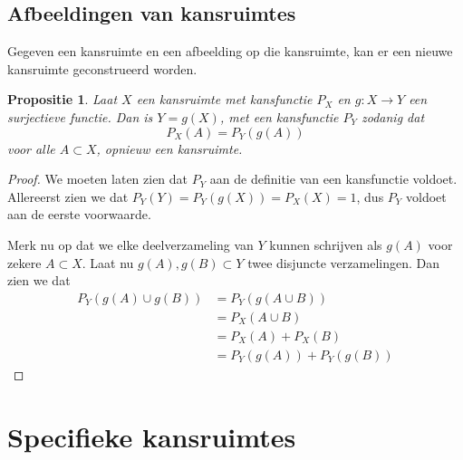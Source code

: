 \documentclass[a4paper]{report}
\newtheorem{proposition}[theorem]{Propositie}
\theoremstyle{definition}
\begin{document}
\section{Afbeeldingen van kansruimtes}
Gegeven een kansruimte en een afbeelding op die kansruimte, kan er een nieuwe kansruimte geconstrueerd worden.

\begin{proposition}
    Laat $X$ een kansruimte met kansfunctie $P_X$ en $g: X \to Y$ een surjectieve functie.
    Dan is $Y = g(X)$, met een kansfunctie $P_Y$ zodanig dat 
    \[ P_X(A) = P_Y(g(A)) \]
    voor alle $A \subset X$, opnieuw een kansruimte.
\end{proposition}
\begin{proof}
    We moeten laten zien dat $P_Y$ aan de definitie van een kansfunctie voldoet.
    Allereerst zien we dat $P_Y(Y) = P_Y(g(X)) = P_X(X) = 1$, dus $P_Y$ voldoet aan de eerste voorwaarde.

    Merk nu op dat we elke deelverzameling van $Y$ kunnen schrijven als $g(A)$ voor zekere $A \subset X$. 
    Laat nu $g(A),g(B) \subset Y$ twee disjuncte verzamelingen.
    Dan zien we dat 
    \begin{align*}
        P_Y(g(A) \cup g(B)) &= P_Y(g(A \cup B)) \\
                            &= P_X(A \cup B) \\
                            &= P_X(A) + P_X(B) \\
                            &= P_Y(g(A)) + P_Y(g(B))
    \end{align*}

\end{proof}


\chapter{Specifieke kansruimtes}
\end{document}
